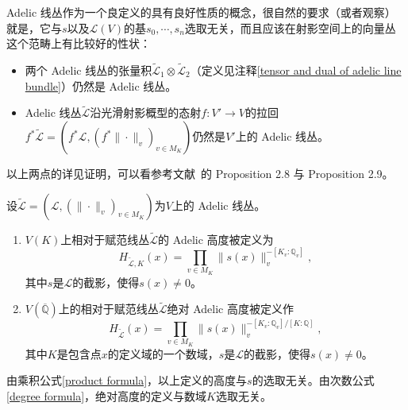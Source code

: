 \begin{remark}
Adelic 线丛作为一个良定义的具有良好性质的概念，很自然的要求（或者观察）就是，它与$s$以及$\mathscr{L}(V)$的基$s_0,\cdots,s_n$选取无关，而且应该在射影空间上的向量丛这个范畴上有比较好的性状：
\begin{itemize}
\item 两个 Adelic 线丛的张量积$\widetilde{\mathscr{L}}_1 \otimes \widetilde{\mathscr{L}}_2$（定义见注释\ref{tensor and dual of adelic line bundle}）仍然是 Adelic 线丛。
\item Adelic 线丛$\widetilde{\mathscr{L}}$沿光滑射影概型的态射$f: V' \longrightarrow V$的拉回$f^*\widetilde{\mathscr{L}} = {(f^*\mathscr{L}, (f^*\|\cdot\|_{v})_{v\in M_K})}$仍然是$V'$上的 Adelic 线丛。
\end{itemize}
以上两点的详见证明，可以看参考文献~的 Proposition 2.8 与 Proposition 2.9。
\end{remark}

\begin{definition}
设$\widetilde{\mathscr{L}} = (\mathscr{L}, (\|\cdot\|_v)_{v\in M_K})$为$V$上的 Adelic 线丛。
\begin{enumerate}
\item $V(K)$上相对于赋范线丛$\widetilde{\mathscr{L}}$的 Adelic 高度被定义为
\begin{equation}
H_{\widetilde{\mathscr{L}}, K}(x) = \prod\limits_{v\in M_K} \|s(x)\|_v^{-[K_v:\mathbb{Q}_v]},
\end{equation}
其中$s$是$\mathscr{L}$的截影，使得$s(x)\neq 0$。
\item $V(\overline{\mathbb{Q}})$上的相对于赋范线丛$\widetilde{\mathscr{L}}$绝对 Adelic 高度被定义作
\begin{equation}
H_{\widetilde{\mathscr{L}}}(x) = \prod\limits_{v\in M_K} \|s(x)\|_v^{-[K_v:\mathbb{Q}_v] / [K:\mathbb{Q}]},
\end{equation}
其中$K$是包含点$x$的定义域的一个数域，$s$是$\mathscr{L}$的截影，使得$s(x)\neq 0$。
\end{enumerate}
\end{definition}

\begin{remark}
由乘积公式\eqref{product formula}，以上定义的高度与$s$的选取无关。由次数公式\eqref{degree formula}，绝对高度的定义与数域$K$选取无关。
\end{remark}


